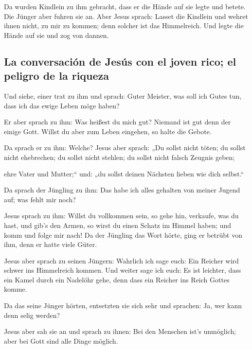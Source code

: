  Da wurden Kindlein zu ihm gebracht, dass er die Hände
auf sie legte und betete. Die Jünger aber fuhren sie an. 
Aber Jesus sprach: Lasset die Kindlein und wehret ihnen nicht, zu mir zu
kommen; denn solcher ist das Himmelreich.  Und legte die
Hände auf sie und zog von dannen.

\hypertarget{la-conversaciuxf3n-de-jesuxfas-con-el-joven-rico-el-peligro-de-la-riqueza}{%
\subsection{La conversación de Jesús con el joven rico; el peligro de la
riqueza}\label{la-conversaciuxf3n-de-jesuxfas-con-el-joven-rico-el-peligro-de-la-riqueza}}

 Und siehe, einer trat zu ihm und sprach: Guter Meister,
was soll ich Gutes tun, dass ich das ewige Leben möge haben?

 Er aber sprach zu ihm: Was heißest du mich gut? Niemand
ist gut denn der einige Gott. Willst du aber zum Leben eingehen, so
halte die Gebote.

 Da sprach er zu ihm: Welche? Jesus aber sprach: „Du
sollst nicht töten; du sollst nicht ehebrechen; du sollst nicht stehlen;
du sollst nicht falsch Zeugnis geben;

 ehre Vater und Mutter;`` und: „du sollst deinen Nächsten
lieben wie dich selbst.``

 Da sprach der Jüngling zu ihm: Das habe ich alles
gehalten von meiner Jugend auf; was fehlt mir noch?

 Jesus sprach zu ihm: Willst du vollkommen sein, so gehe
hin, verkaufe, was du hast, und gib's den Armen, so wirst du einen
Schatz im Himmel haben; und komm und folge mir nach!  Da
der Jüngling das Wort hörte, ging er betrübt von ihm, denn er hatte
viele Güter.

 Jesus aber sprach zu seinen Jüngern: Wahrlich ich sage
euch: Ein Reicher wird schwer ins Himmelreich kommen. 
Und weiter sage ich euch: Es ist leichter, dass ein Kamel durch ein
Nadelöhr gehe, denn dass ein Reicher ins Reich Gottes komme.

 Da das seine Jünger hörten, entsetzten sie sich sehr und
sprachen: Ja, wer kann denn selig werden?

 Jesus aber sah sie an und sprach zu ihnen: Bei den
Menschen ist's unmöglich; aber bei Gott sind alle Dinge möglich.

